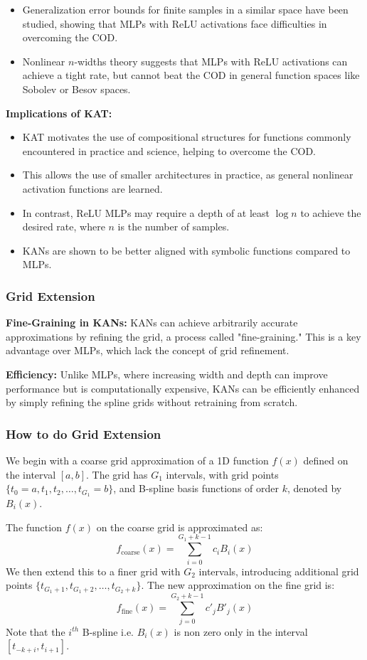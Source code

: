 \documentclass[serif, aspectratio=169]{beamer}
\begin{document}
\begin{frame}
    \begin{itemize}
        \item Generalization error bounds for finite samples in a similar space have been studied, showing that MLPs with ReLU activations face difficulties in overcoming the COD.
        \item Nonlinear \( n \)-widths theory suggests that MLPs with ReLU activations can achieve a tight rate, but cannot beat the COD in general function spaces like Sobolev or Besov spaces.
    \end{itemize}
    \textbf{Implications of KAT:}
    \begin{itemize}
        \item KAT motivates the use of compositional structures for functions commonly encountered in practice and science, helping to overcome the COD.
        \item This allows the use of smaller architectures in practice, as general nonlinear activation functions are learned.
        \item In contrast, ReLU MLPs may require a depth of at least \( \log n \) to achieve the desired rate, where \( n \) is the number of samples.
        \item KANs are shown to be better aligned with symbolic functions compared to MLPs.
    \end{itemize}
\end{frame}
\begin{frame}
    \frametitle<presentation>{Grid Extension}
    \textbf{Fine-Graining in KANs:} KANs can achieve arbitrarily accurate approximations by refining the grid, a process called "fine-graining." This is a key advantage over MLPs, which lack the concept of grid refinement.

    \textbf{Efficiency:} Unlike MLPs, where increasing width and depth can improve performance but is computationally expensive, KANs can be efficiently enhanced by simply refining the spline grids without retraining from scratch.
\end{frame}
\begin{frame}
    \frametitle<presentation>{How to do Grid Extension}
    We begin with a coarse grid approximation of a 1D function \( f(x) \) defined on the interval \([a, b]\). The grid has \( G_1 \) intervals, with grid points \( \{t_0 = a, t_1, t_2, \dots, t_{G_1} = b\} \), and B-spline basis functions of order \( k \), denoted by \( B_i(x) \).

    The function \( f(x) \) on the coarse grid is approximated as:
    \[
        f_{\text{coarse}}(x) = \sum_{i=0}^{G_1+k-1} c_i B_i(x)
    \]
    We then extend this to a finer grid with \( G_2 \) intervals, introducing additional grid points \( \{t_{G_1+1}, t_{G_1+2}, \dots, t_{G_2+k}\} \). The new approximation on the fine grid is:
    \[
        f_{\text{fine}}(x) = \sum_{j=0}^{G_2+k-1} c'_j B'_j(x)
    \]
    Note that the $i^{th}$ B-spline i.e. $B_i(x)$ is non zero only in the interval $[t_{-k+i}, t_{i+1}]$.
\end{frame}
\end{document}
